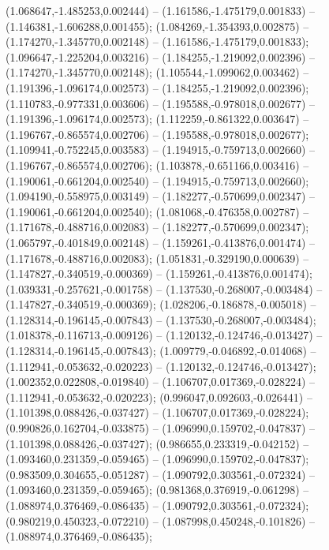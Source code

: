 (1.068647,-1.485253,0.002444) -- (1.161586,-1.475179,0.001833) -- (1.146381,-1.606288,0.001455);
 (1.084269,-1.354393,0.002875) -- (1.174270,-1.345770,0.002148) -- (1.161586,-1.475179,0.001833);
 (1.096647,-1.225204,0.003216) -- (1.184255,-1.219092,0.002396) -- (1.174270,-1.345770,0.002148);
 (1.105544,-1.099062,0.003462) -- (1.191396,-1.096174,0.002573) -- (1.184255,-1.219092,0.002396);
 (1.110783,-0.977331,0.003606) -- (1.195588,-0.978018,0.002677) -- (1.191396,-1.096174,0.002573);
 (1.112259,-0.861322,0.003647) -- (1.196767,-0.865574,0.002706) -- (1.195588,-0.978018,0.002677);
 (1.109941,-0.752245,0.003583) -- (1.194915,-0.759713,0.002660) -- (1.196767,-0.865574,0.002706);
 (1.103878,-0.651166,0.003416) -- (1.190061,-0.661204,0.002540) -- (1.194915,-0.759713,0.002660);
 (1.094190,-0.558975,0.003149) -- (1.182277,-0.570699,0.002347) -- (1.190061,-0.661204,0.002540);
 (1.081068,-0.476358,0.002787) -- (1.171678,-0.488716,0.002083) -- (1.182277,-0.570699,0.002347);
 (1.065797,-0.401849,0.002148) -- (1.159261,-0.413876,0.001474) -- (1.171678,-0.488716,0.002083);
 (1.051831,-0.329190,0.000639) -- (1.147827,-0.340519,-0.000369) -- (1.159261,-0.413876,0.001474);
 (1.039331,-0.257621,-0.001758) -- (1.137530,-0.268007,-0.003484) -- (1.147827,-0.340519,-0.000369);
 (1.028206,-0.186878,-0.005018) -- (1.128314,-0.196145,-0.007843) -- (1.137530,-0.268007,-0.003484);
 (1.018378,-0.116713,-0.009126) -- (1.120132,-0.124746,-0.013427) -- (1.128314,-0.196145,-0.007843);
 (1.009779,-0.046892,-0.014068) -- (1.112941,-0.053632,-0.020223) -- (1.120132,-0.124746,-0.013427);
 (1.002352,0.022808,-0.019840) -- (1.106707,0.017369,-0.028224) -- (1.112941,-0.053632,-0.020223);
 (0.996047,0.092603,-0.026441) -- (1.101398,0.088426,-0.037427) -- (1.106707,0.017369,-0.028224);
 (0.990826,0.162704,-0.033875) -- (1.096990,0.159702,-0.047837) -- (1.101398,0.088426,-0.037427);
 (0.986655,0.233319,-0.042152) -- (1.093460,0.231359,-0.059465) -- (1.096990,0.159702,-0.047837);
 (0.983509,0.304655,-0.051287) -- (1.090792,0.303561,-0.072324) -- (1.093460,0.231359,-0.059465);
 (0.981368,0.376919,-0.061298) -- (1.088974,0.376469,-0.086435) -- (1.090792,0.303561,-0.072324);
 (0.980219,0.450323,-0.072210) -- (1.087998,0.450248,-0.101826) -- (1.088974,0.376469,-0.086435);
